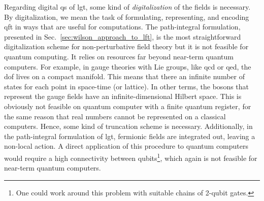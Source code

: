 Regarding digital \ac{qs} of \ac{lgt}, some kind of \emph{digitalization} of the fields is necessary.
By digitalization, we mean the task of formulating, representing, and encoding \ac{qft} in ways that are useful for computations.
The path-integral formulation, presented in Sec.~\ref{sec:wilson_approach_to_lft}, is the most straightforward digitalization scheme for non-perturbative field theory but it is not feasible for quantum computing.
It relies on resources far beyond near-term quantum computers.
For example, in gauge theories with Lie groups, like \ac{qcd} or \ac{qed}, the \ac{dof} lives on a compact manifold.
This means that there an infinite number of states for each point in space-time (or lattice).
In other terms, the bosons that represent the gauge fields have an infinite-dimensional Hilbert space.
This is obviously not feasible on quantum computer with a finite quantum register, for the same reason that real numbers cannot be represented on a classical computers.
Hence, some kind of truncation scheme is necessary.
Additionally, in the path-integral formulation of \ac{lgt}, fermionic fields are integrated out, leaving a non-local action.
A direct application of this procedure to quantum computers would require a high connectivity between qubits\footnote{One could work around this problem with suitable chains of 2-qubit gates.}, which again is not feasible for near-term quantum computers.

\bigskip

